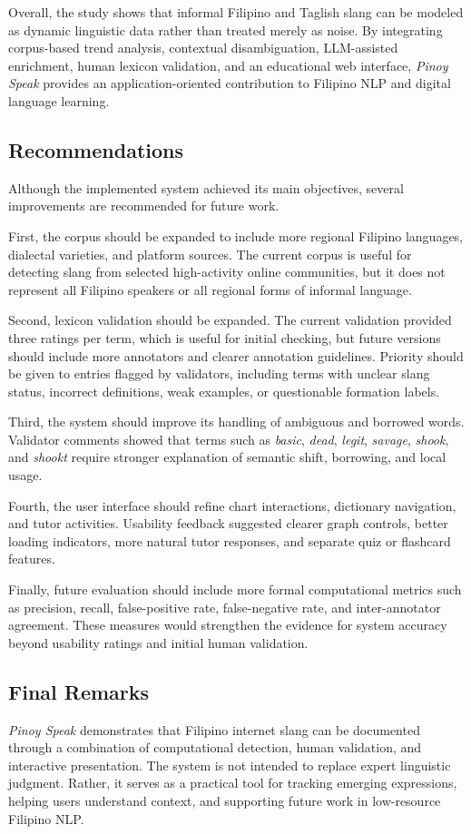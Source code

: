 Overall, the study shows that informal Filipino and Taglish
slang can be modeled as dynamic linguistic data rather than
treated merely as noise. By integrating corpus-based trend
analysis, contextual disambiguation, LLM-assisted enrichment,
human lexicon validation, and an educational web interface,
\textit{Pinoy Speak} provides an application-oriented
contribution to Filipino NLP and digital language learning.

\subsection{Recommendations}

Although the implemented system achieved its main objectives,
several improvements are recommended for future work.

First, the corpus should be expanded to include more regional
Filipino languages, dialectal varieties, and platform sources.
The current corpus is useful for detecting slang from selected
high-activity online communities, but it does not represent
all Filipino speakers or all regional forms of informal
language.

Second, lexicon validation should be expanded. The current
validation provided three ratings per term, which is useful
for initial checking, but future versions should include more
annotators and clearer annotation guidelines. Priority should
be given to entries flagged by validators, including terms
with unclear slang status, incorrect definitions, weak
examples, or questionable formation labels.

Third, the system should improve its handling of ambiguous
and borrowed words. Validator comments showed that terms such
as \textit{basic}, \textit{dead}, \textit{legit},
\textit{savage}, \textit{shook}, and \textit{shookt} require
stronger explanation of semantic shift, borrowing, and local
usage.

Fourth, the user interface should refine chart interactions,
dictionary navigation, and tutor activities. Usability
feedback suggested clearer graph controls, better loading
indicators, more natural tutor responses, and separate quiz
or flashcard features.

Finally, future evaluation should include more formal
computational metrics such as precision, recall,
false-positive rate, false-negative rate, and
inter-annotator agreement. These measures would strengthen
the evidence for system accuracy beyond usability ratings and
initial human validation.

\subsection{Final Remarks}

\textit{Pinoy Speak} demonstrates that Filipino internet slang
can be documented through a combination of computational
detection, human validation, and interactive presentation.
The system is not intended to replace expert linguistic
judgment. Rather, it serves as a practical tool for tracking
emerging expressions, helping users understand context, and
supporting future work in low-resource Filipino NLP.
